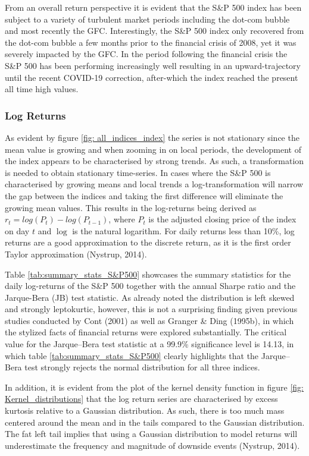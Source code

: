 From an overall return perspective it is evident that the S\&P 500 index has been subject to a variety of turbulent market periods including the dot-com bubble and most recently the GFC. Interestingly, the S\&P 500 index only recovered from the dot-com bubble a few months prior to the financial crisis of 2008, yet it was severely impacted by the GFC. In the period following the financial crisis the S\&P 500 has been performing increasingly well resulting in an upward-trajectory until the recent COVID-19 correction, after-which the index reached the present all time high values. 

\subsubsection{Log Returns}
As evident by figure \ref{fig: all_indices_index} the series is not stationary since the mean value is growing and when zooming in on local periods, the development of the index appears to be characterised by strong trends. As such, a transformation is needed to obtain stationary time-series. In cases where the S\&P 500 is characterised by growing means and local trends a log-transformation will narrow the gap between the indices and taking the first difference will eliminate the growing mean values. This results in the log-returns being derived as $r_t = log(P_t) - log(P_{t-1})$, where $P_t$ is the adjusted closing price of the index on day $t$ and $\log$ is the natural logarithm. For daily returns less than 10\%, log returns are a good approximation to the discrete return, as it is the first order Taylor approximation (Nystrup, 2014).

Table \ref{tab:summary_stats_S&P500} showcases the summary statistics for the daily log-returns of the S\&P 500 together with the annual Sharpe ratio and the Jarque-Bera (JB) test statistic. As already noted the distribution is left skewed and strongly leptokurtic, however, this is not a surprising finding given previous studies conducted by Cont (2001) as well as Granger \& Ding (1995b), in which the stylized facts of financial returns were explored substantially. The critical value for the Jarque–Bera test statistic at a 99.9\% significance level is 14.13, in which table \ref{tab:summary_stats_S&P500} clearly highlights that the Jarque–Bera test strongly rejects the normal distribution for all three indices.  

In addition, it is evident from the plot of the kernel density function in figure \ref{fig: Kernel_distributions} that the log return series are characterised by excess kurtosis relative to a Gaussian distribution. As such, there is too much mass centered around the mean and in the tails compared to the Gaussian distribution. The fat left tail implies that using a Gaussian distribution to model returns will underestimate the frequency and magnitude of downside events (Nystrup, 2014). 

